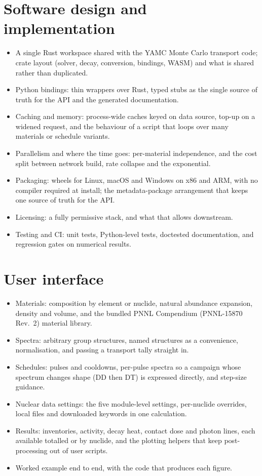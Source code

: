 \section{Software design and implementation}
\begin{itemize}
  \item A single Rust workspace shared with the YAMC Monte Carlo transport
        code; crate layout (solver, decay, conversion, bindings, WASM) and
        what is shared rather than duplicated.
  \item Python bindings: thin wrappers over Rust, typed stubs as the single
        source of truth for the API and the generated documentation.
  \item Caching and memory: process-wide caches keyed on data source, top-up
        on a widened request, and the behaviour of a script that loops over
        many materials or schedule variants.
  \item Parallelism and where the time goes: per-material independence, and
        the cost split between network build, rate collapse and the
        exponential.
  \item Packaging: wheels for Linux, macOS and Windows on x86 and ARM, with
        no compiler required at install; the metadata-package arrangement
        that keeps one source of truth for the API.
  \item Licensing: a fully permissive stack, and what that allows downstream.
  \item Testing and CI: unit tests, Python-level tests, doctested
        documentation, and regression gates on numerical results.
\end{itemize}

\section{User interface}
\begin{itemize}
  \item Materials: composition by element or nuclide, natural abundance
        expansion, density and volume, and the bundled PNNL Compendium
        (PNNL-15870 Rev.~2) material library.
  \item Spectra: arbitrary group structures, named structures as a
        convenience, normalisation, and passing a transport tally straight
        in.
  \item Schedules: pulses and cooldowns, per-pulse spectra so a campaign
        whose spectrum changes shape (DD then DT) is expressed directly,
        and step-size guidance.
  \item Nuclear data settings: the five module-level settings, per-nuclide
        overrides, local files and downloaded keywords in one calculation.
  \item Results: inventories, activity, decay heat, contact dose and photon
        lines, each available totalled or by nuclide, and the plotting
        helpers that keep post-processing out of user scripts.
  \item Worked example end to end, with the code that produces each figure.
\end{itemize}

